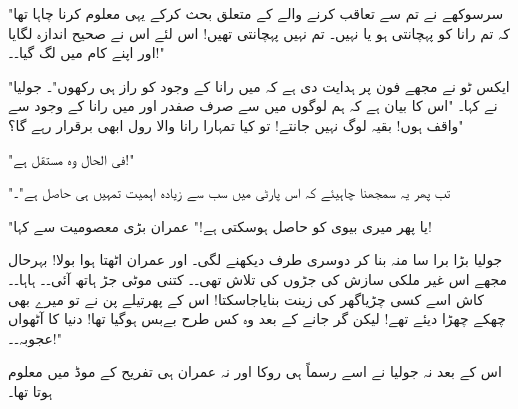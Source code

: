 "سرسوکھے نے تم سے تعاقب کرنے والے کے متعلق بحث کرکے یہی معلوم کرنا چاہا تھا کہ تم رانا کو پہچانتی ہو یا نہیں۔ تم نہیں پہچانتی تھیں! اس لئے اس نے صحیح اندازہ لگایا اور اپنے کام میں لگ گیا۔۔!"

"ایکس ٹو نے مجھے فون پر ہدایت دی ہے کہ میں رانا کے وجود کو راز ہی رکھوں"۔ جولیا نے کہا۔ "اس کا بیان ہے کہ ہم لوگوں میں سے صرف صفدر اور میں رانا کے وجود سے واقف ہوں! بقیہ لوگ نہیں جانتے! تو کیا تمہارا رانا والا رول ابھی برقرار رہے گا؟"

"فی الحال وہ مستقل ہے!"

"تب پھر یہ سمجھنا چاہیئے کہ اس پارٹی میں سب سے زیادہ اہمیت تمہیں ہی حاصل ہے"۔

"یا پھر میری بیوی کو حاصل ہوسکتی ہے!" عمران بڑی معصومیت سے کہا!

جولیا بڑا برا سا منہ بنا کر دوسری طرف دیکھنے لگی۔ اور عمران اٹھتا ہوا بولا! بہرحال مجھے اس غیر ملکی سازش کی جڑوں کی تلاش تھی۔۔ کتنی موٹی جڑ ہاتھ آئی۔۔ ہاہا۔۔ کاش اسے کسی چڑیاگھر کی زینت بنایاجاسکتا! اس کے پھرتیلے پن نے تو میرے بھی چھکے چھڑا دیئے تھے! لیکن گر جانے کے بعد وہ کس طرح بےبس ہوگیا تھا! دنیا کا آٹھواں عجوبہ۔۔!"

اس کے بعد نہ جولیا نے اسے رسماً ہی روکا اور نہ عمران ہی تفریح کے موڈ میں معلوم ہوتا تھا۔


\endR

\centerline{}

\centerline{}

\bye


